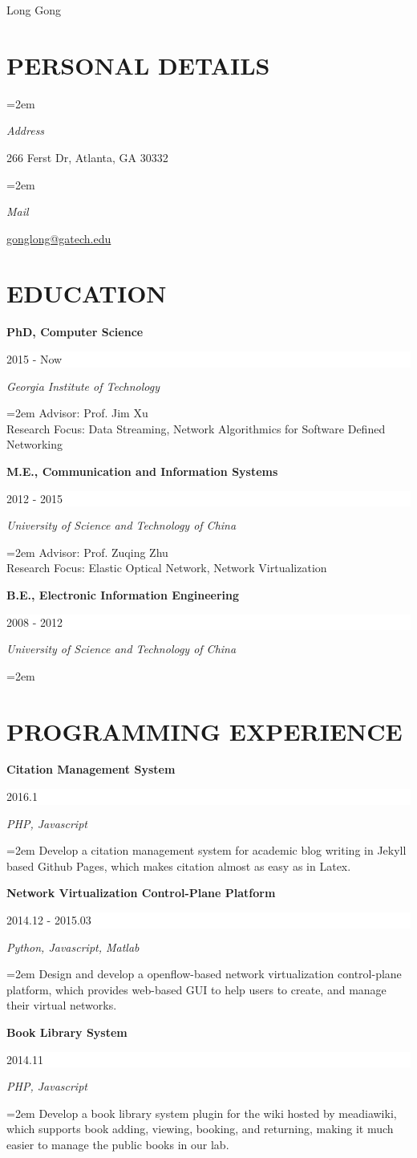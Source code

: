 \documentclass[paper=a4,fontsize=11pt]{scrartcl} %
\newlength{\spacebox}
\newcommand{\sepspace}{\vspace*{1em}}		%
\newcommand{\MyName}[1]{ %
		\begin{center}\Huge \usefont{OT1}{phv}{b}{n} #1\end{center}
		\par \normalsize \normalfont}
\newcommand{\MySlogan}[1]{ %
		\large \usefont{OT1}{phv}{m}{n}\hfill \textit{#1}
		\par \normalsize \normalfont}
\newcommand{\NewPart}[1]{\section*{\uppercase{#1}}}
\newcommand{\PersonalEntry}[2]{
		\noindent\hangindent=2em\hangafter=0 %
		\parbox{\spacebox}{        %
		\textit{#1}}		       %
		\hspace{1.5em} #2 \par}    %
\newcommand{\EducationEntry}[4]{
		\noindent \textbf{#1} \hfill      %
		\colorbox{White}{%
			\parbox{8em}{%
			\hfill\color{Black}#2}} \par  %
		\noindent \textit{#3} \par        %
		\noindent\hangindent=2em\hangafter=0 \small #4 %
		\normalsize \par}
\begin{document}

\MyName{Long Gong}

\sepspace

\NewPart{Personal details}{}

\PersonalEntry{Address}{266 Ferst Dr, Atlanta, GA 30332}
\PersonalEntry{Mail}{\url{gonglong@gatech.edu}}


\NewPart{Education}{}
\EducationEntry{PhD, Computer Science}{2015 - Now}{Georgia Institute of Technology}{Advisor: Prof. Jim Xu \\Research Focus: Data Streaming, Network Algorithmics for Software Defined Networking}
\sepspace

\EducationEntry{M.E., Communication and Information Systems}{2012 - 2015}{University of Science and Technology of China}{Advisor: Prof. Zuqing Zhu\\Research Focus: Elastic Optical Network, Network Virtualization}
\sepspace

\EducationEntry{B.E., Electronic Information Engineering}{2008 - 2012}{University of Science and Technology of China}{}

\NewPart{Programming experience}{}
\EducationEntry{Citation Management System}{2016.1}{PHP, Javascript}{Develop a citation management system for academic blog writing in Jekyll based Github Pages, which makes citation almost as easy as in Latex.}
\EducationEntry{Network Virtualization Control-Plane Platform}{2014.12 - 2015.03}{Python, Javascript, Matlab}{Design and develop a openflow-based network virtualization control-plane platform, which provides web-based GUI to help users to create, and manage their virtual networks.}
\EducationEntry{Book Library System}{2014.11}{PHP, Javascript}{Develop a book library system plugin for the wiki hosted by meadiawiki, which supports book adding, viewing, booking, and returning, making it much easier to manage the public books in our lab.}
\end{document}
